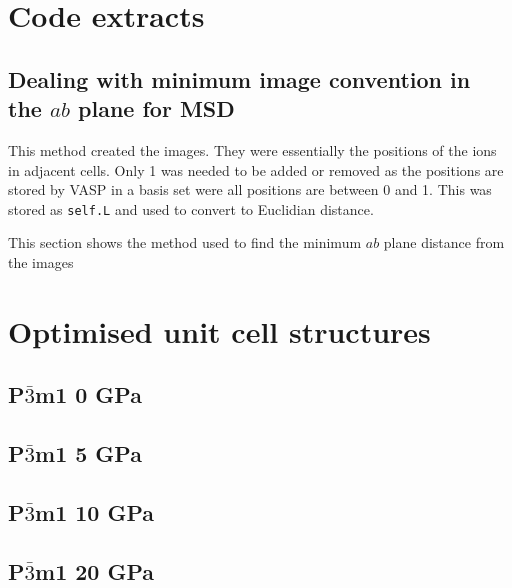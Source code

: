 \documentclass[a4paper,12pt]{article}
\begin{document}
\section{Code extracts}

\subsection*{Dealing with minimum image convention in the $ab$ plane for MSD}
This method created the images. They were essentially the positions of the ions in adjacent cells. Only 1 was needed to be added or removed as the positions are stored by VASP in a basis set were all positions are between 0 and 1. This was stored as \texttt{self.L} and used to convert to Euclidian distance.


This section shows the method used to find the minimum $ab$ plane distance from the images



\section{Optimised unit cell structures}

\subsection*{P$\bar3$m1 0 GPa}


\medskip

\subsection*{P$\bar3$m1 5 GPa}


\medskip

\subsection*{P$\bar3$m1 10 GPa}


\medskip

\subsection*{P$\bar3$m1 20 GPa}

\end{document}
